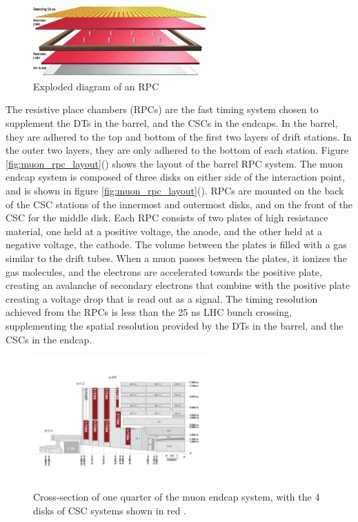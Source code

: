 \begin{figure}[h]
   \centering
  \includegraphics[width=0.6\textwidth]{Figures/CMS_Diagrams/Muon__RPC_schematic.jpg}
  \caption{Exploded diagram of an RPC \cite{CMS:muon_rpc_image}} \label{fig:muon_rpc}
\end{figure}

\par The resistive place chambers (RPCs) are the fast timing system
chosen to supplement the DTs in the barrel, and the CSCs in the
endcaps.  In the barrel, they are adhered to the top and bottom of the
first two layers of drift stations.  In the outer two layers, they are
only adhered to the bottom of each station.  Figure
\ref{fig:muon_rpc_layout}() shows the
layout of the barrel RPC system.  The muon endcap system is composed
of three disks on either side of the interaction point, and is shown
in figure
\ref{fig:muon_rpc_layout}().  RPCs
are mounted on the back of the CSC stations of the innermost and
outermost disks, and on the front of the CSC for the middle disk. Each
RPC consists of two plates of high resistance material, one held at a
positive voltage, the anode, and the other held at a negative voltage, 
the cathode.  The volume between the plates is filled with a gas
similar to the drift tubes.  When a muon passes between the plates, it
ionizes the gas molecules, and the electrons are accelerated towards
the positive plate, creating an avalanche of secondary electrons that
combine with the positive plate creating a voltage drop that is read
out as a signal.  The timing resolution achieved from the RPCs is less
than the 25 ns LHC bunch crossing, supplementing the spatial
resolution provided by the DTs in the barrel, and the CSCs in the
endcap.  

\begin{figure}[h]
   \centering
  \includegraphics[width=0.6\textwidth]{Figures/CMS_Diagrams/Muon__Endcap_CSC_layout.pdf}
  \caption{Cross-section of one quarter of the muon endcap system,
    with the 4 disks of CSC systems shown in red
    \cite{CMS:CMS_Machine_Chatrchyan:2008aa}. } \label{fig:muon_csc_layout}
\end{figure}

